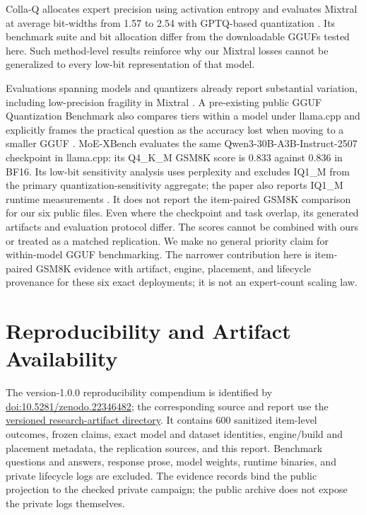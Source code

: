 \documentclass[11pt]{article}
\begin{document}
Colla-Q allocates expert precision using activation entropy and evaluates
Mixtral at average bit-widths from 1.57 to 2.54 with GPTQ-based quantization
\citep{shin2026collaq}. Its benchmark suite and bit allocation differ from
the downloadable GGUFs tested here. Such method-level results reinforce why
our Mixtral losses cannot be generalized to every low-bit representation of
that model.

Evaluations spanning models and quantizers already report substantial
variation, including low-precision fragility in Mixtral
\citep{moefragile2024,li2024quantmoebench}. A pre-existing public GGUF
Quantization Benchmark also compares tiers within a model under llama.cpp and
explicitly frames the practical question as the accuracy lost when moving to a
smaller GGUF \citep{rougy2026ggufbench}. MoE-XBench evaluates the same
Qwen3-30B-A3B-Instruct-2507 checkpoint in llama.cpp: its Q4\_K\_M GSM8K score
is 0.833 against 0.836 in BF16. Its low-bit sensitivity analysis uses
perplexity and excludes IQ1\_M from the primary quantization-sensitivity
aggregate; the paper also reports IQ1\_M runtime measurements
\citep{benazir2026moexbench}. It does not report the item-paired GSM8K
comparison for our six public files. Even where the checkpoint and task
overlap, its generated artifacts and evaluation protocol differ. The scores
cannot be combined with ours or treated as a matched replication. We make no
general priority claim for within-model GGUF benchmarking. The narrower
contribution here is item-paired GSM8K evidence
with artifact, engine, placement, and lifecycle provenance for these six exact
deployments; it is not an expert-count scaling law.

\section{Reproducibility and Artifact Availability}

The version-1.0.0 reproducibility compendium is identified by
\href{https://doi.org/10.5281/zenodo.22346482}{doi:10.5281/zenodo.22346482};
the corresponding source and report use the
\href{https://github.com/matthematics1137/research-artifacts/tree/moe-quantization-granularity-v1.0.0/papers/2026-moe-quantization-granularity}{versioned research-artifact directory}.
It contains 600 sanitized item-level outcomes, frozen claims, exact model and
dataset identities, engine/build and placement metadata, the replication
sources, and this report. Benchmark questions and answers, response prose,
model weights, runtime binaries, and private lifecycle logs are excluded.
The evidence records bind the public projection to the checked private
campaign; the public archive does not expose the private logs themselves.
\end{document}
